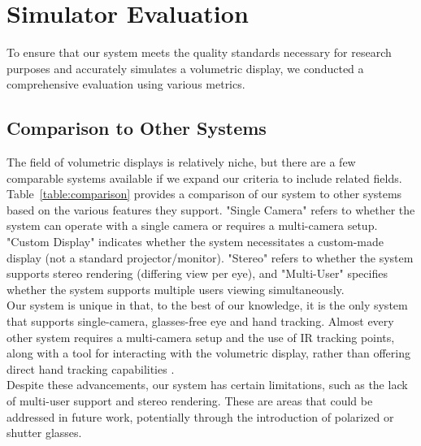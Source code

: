 \section{Simulator Evaluation}

To ensure that our system meets the quality standards necessary for research purposes and accurately simulates a volumetric display, we conducted a comprehensive evaluation using various metrics.

\subsection{Comparison to Other Systems}

The field of volumetric displays is relatively niche, but there are a few comparable systems available if we expand our criteria to include related fields. Table~\ref{table:comparison} provides a comparison of our system to other systems based on the various features they support. "Single Camera" refers to whether the system can operate with a single camera or requires a multi-camera setup. "Custom Display" indicates whether the system necessitates a custom-made display (not a standard projector/monitor). "Stereo" refers to whether the system supports stereo rendering (differing view per eye), and "Multi-User" specifies whether the system supports multiple users viewing simultaneously. \\

Our system is unique in that, to the best of our knowledge, it is the only system that supports single-camera, glasses-free eye and hand tracking. Almost every other system requires a multi-camera setup and the use of IR tracking points, along with a tool for interacting with the volumetric display, rather than offering direct hand tracking capabilities \cite{913797}. \\

Despite these advancements, our system has certain limitations, such as the lack of multi-user support and stereo rendering. These are areas that could be addressed in future work, potentially through the introduction of polarized or shutter glasses.

